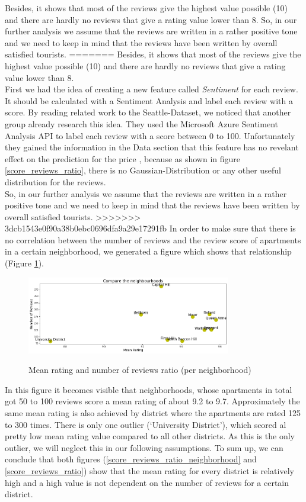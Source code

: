 \documentclass[journal]{IEEEtran}
\begin{document}
Besides, it shows that most of the reviews give the highest value possible (10) and there are hardly no reviews that give a rating value lower than 8. So, in our further analysis we assume that the reviews are written in a rather positive tone and we need to keep in mind that the reviews have been written by overall satisfied tourists.
=======
Besides, it shows that most of the reviews give the highest value possible (10) and there are hardly no reviews that give a rating value lower than 8. \\
First we had the idea of creating a new feature called \textit{Sentiment} for each review. It should be calculated with a Sentiment Analysis and label each review with a score. By reading related work to the Seattle-Dataset, we noticed that another group already research this idea. They used the Microsoft Azure Sentiment Analysis API to label each review with a score between 0 to 100. Unfortunately they gained the information in the Data section that this feature has no revelant effect on the prediction for the price \cite{RN1}, because as shown in figure \ref{score_reviews_ratio}, there is no Gaussian-Distribution or any other useful distribution for the reviews. \\

So, in our further analysis we assume that the reviews are written in a rather positive tone and we need to keep in mind that the reviews have been written by overall satisfied tourists.
>>>>>>> 3dcb1543e0f90a38b0ebc0696dfa9a29e17291fb
In order to make sure that there is no correlation between the number of reviews and the review score of apartments in a certain neighborhood, we generated a figure which shows that relationship (Figure \ref{compare_the_neighbourhoods}).
%
\begin{figure}
  \begin{center}
  \includegraphics[width=3.5in]{photo/2_2_compare_the_neighbourhoods.png}\\
  \caption{Mean rating and number of reviews ratio (per neighborhood)}\label{compare_the_neighbourhoods}
  \end{center}
\end{figure}
%
In this figure it becomes visible that neighborhoods, whose apartments in total got 50 to 100 reviews score a mean rating of about 9.2 to 9.7. Approximately the same mean rating is also achieved by district where the apartments are rated 125 to 300 times. There is only one outlier (‘University District’), which scored al pretty low mean rating value compared to all other districts. As this is the only outlier, we will neglect this in our following assumptions.
To sum up, we can conclude that both figures (\ref{score_reviews_ratio_neighborhood} and \ref{score_reviews_ratio}) show that the mean rating for every district is relatively high and a high value is not dependent on the number of reviews for a certain district.
\end{document}
